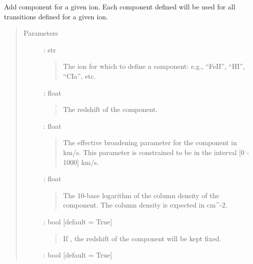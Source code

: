 \documentclass[letterpaper,10pt,english]{sphinxmanual}
\begin{document}
\begin{fulllineitems}
\begin{fulllineitems}
\begin{itemize}
\end{itemize}

\end{fulllineitems}


\begin{fulllineitems}
\label{\detokenize{api:VoigtFit.DataSet.add_component}}
Add component for a given ion. Each component defined will be used for all transitions
defined for a given ion.
\begin{quote}\begin{description}
\item[{Parameters}] \leavevmode
{} : str
\begin{quote}

The ion for which to define a component: e.g., “FeII”, “HI”, “CIa”, etc.
\end{quote}

 : float
\begin{quote}

The redshift of the component.
\end{quote}

 : float
\begin{quote}

The effective broadening parameter for the component in km/s.
This parameter is constrained to be in the interval {[}0 - 1000{]} km/s.
\end{quote}

 : float
\begin{quote}

The 10-base logarithm of the column density of the component.
The column density is expected in cm\textasciicircum{}-2.
\end{quote}

 : bool   {[}default = True{]}
\begin{quote}

If , the redshift of the component will be kept fixed.
\end{quote}

 : bool   {[}default = True{]}
\begin{quote}


\end{quote}
\end{description}
\end{quote}
\end{fulllineitems}
\end{fulllineitems}
\end{document}
